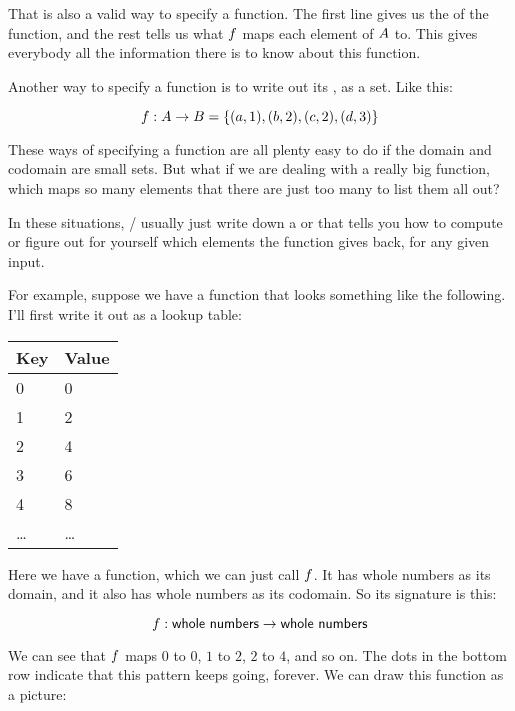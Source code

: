 \documentclass[../../../main.tex]{subfiles}
\begin{document}
That is also a valid way to specify a function. The first line gives us the  of the function, and the rest tells us what $f$ maps each element of $A$ to. This gives everybody all the information there is to know about this function.

Another way to specify a function is to write out its , as a set. Like this:

\begin{equation*}
  f : A \rightarrow B = \{ (a, 1), (b, 2), (c, 2), (d, 3) \}
\end{equation*}

These ways of specifying a function are all plenty easy to do if the domain and codomain are small sets. But what if we are dealing with a really big function, which maps so many elements that there are just too many to list them all out? 

In these situations, \mathers/ usually just write down a  or  that tells you how to compute or figure out for yourself which elements the function gives back, for any given input. 

For example, suppose we have a function that looks something like the following. I'll first write it out as a lookup table:

\begin{center}
  \begin{tabular}{| l | l |}
    \hline
    \textbf{Key} & \textbf{Value} \\ \hline
    0 & 0 \\ \hline
    1 & 2 \\ \hline
    2 & 4 \\ \hline
    3 & 6 \\ \hline
    4 & 8 \\ \hline
    \ldots & \ldots \\ \hline
  \end{tabular}
\end{center}

Here we have a function, which we can just call $f$. It has whole numbers as its domain, and it also has whole numbers as its codomain. So its signature is this:

\begin{equation*}
  f : \mathsf{whole~numbers} \rightarrow \mathsf{whole~numbers}
\end{equation*}

We can see that $f$ maps $0$ to $0$, $1$ to $2$, $2$ to $4$, and so on. The dots in the bottom row indicate that this pattern keeps going, forever. We can draw this function as a picture:
\end{document}
